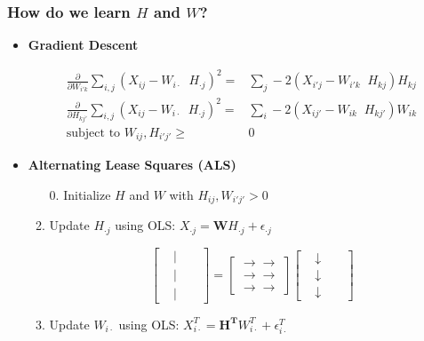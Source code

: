 \documentclass[xcolor={dvipsnames}]{beamer}
\begin{document}
\frame
{
\frametitle{How do we learn $H$ and $W$?}

\begin{itemize}
\item<2-> \textbf{Gradient Descent} 
\vspace{-.5em}
\scriptsize

\begin{align*} 
\frac{\partial}{\partial W_{i'k}} \sum_{i,j} (X_{ij} - {W_{i\cdot}}\;\; {H_{\cdot j}})^2 = {}&  \sum_{j} -2(X_{i'j} - W_{i'k}\;\; H_{kj})H_{kj} \\
\frac{\partial}{\partial H_{kj'}} \sum_{i,j} (X_{ij} - {W_{i\cdot}}\;\; {H_{\cdot j}})^2 ={}& \sum_{i} -2(X_{ij'} - W_{ik}\;\; H_{kj'})W_{ik}\\
\text{subject to } W_{ij}, H_{i'j'}    \geq {}&  0
\end{align*}

\normalsize 

\item<3-> \textbf{Alternating Lease Squares (ALS)}
\begin{enumerate}

\footnotesize

\item[0.] Initialize $H$ and $W$ with $H_{ij}, W_{i'j'}>0$

\item Update $H_{\cdot j}$ using OLS: $X_{\cdot j} = \mathbf{W} {H_{\cdot j}} + \epsilon_{\cdot j}$

\tiny

$$\left[\begin{array}{cccc} & | && \\& | &&  \\& | &&  \end{array} \right] = \left[\begin{array}{c} \longrightarrow\longrightarrow \\ \longrightarrow\longrightarrow \\ \longrightarrow\longrightarrow  \end{array} \right] \left[\begin{array}{cccc} & \downarrow && \\&  \downarrow  && \\&  \downarrow  &&  \end{array} \right] $$

\footnotesize

\item Update $W_{i \cdot}$ using OLS: $X_{i\cdot}^T = \mathbf{H^T} {W_{i \cdot}^T}  + \epsilon_{i \cdot}^T$


\end{enumerate}
\end{itemize}}
\end{document}
